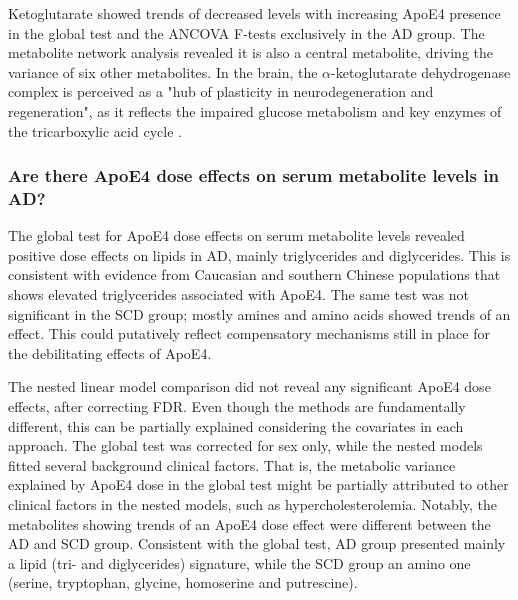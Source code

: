 \documentclass{amsart}
\begin{document}
Ketoglutarate showed trends of decreased levels with increasing ApoE4 presence in the global test and the ANCOVA F-tests exclusively in the AD group. The metabolite network analysis revealed it is also a central metabolite, driving the variance of six other metabolites. In the brain, the $\alpha$-ketoglutarate dehydrogenase complex is perceived as a "hub of plasticity in neurodegeneration and regeneration", as it reflects the impaired glucose metabolism and key enzymes of the tricarboxylic acid cycle \cite*{Hansen2022TheD}.

\subsubsection{Are there ApoE4 dose effects on serum metabolite levels in AD?}
The global test for ApoE4 dose effects on serum metabolite levels revealed positive dose effects on lipids in AD, mainly triglycerides and diglycerides. This is consistent with evidence from Caucasian \cite{Maxwell2013APOEMT,CARVALHOWELLS20121447,Bernath2020SerumTI} and southern Chinese populations \cite{Gan2022EffectsPopulation} that shows elevated triglycerides associated with ApoE4. The same test was not significant in the SCD group; mostly amines and amino acids showed trends of an effect. This could putatively reflect compensatory mechanisms still in place for the debilitating effects of ApoE4.

The nested linear model comparison did not reveal any significant ApoE4 dose effects, after correcting FDR. Even though the methods are fundamentally different, this can be partially explained considering the covariates in each approach. The global test was corrected for sex only, while the nested models fitted several background clinical factors. That is, the metabolic variance explained by ApoE4 dose in the global test might be partially attributed to other clinical factors in the nested models, such as hypercholesterolemia. Notably, the metabolites showing trends of an ApoE4 dose effect were different between the AD and SCD group. Consistent with the global test, AD group presented mainly a lipid (tri- and diglycerides) signature, while the SCD group an amino one (serine, tryptophan, glycine, homoserine and putrescine).
\end{document}
